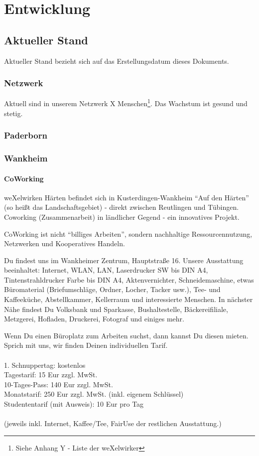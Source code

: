 
\chapter{Entwicklung}
  \section{Aktueller Stand}
Aktueller Stand bezieht sich auf das Erstellungsdatum dieses Dokuments.
    \subsection{Netzwerk}
Aktuell sind in unserem Netzwerk X Menschen\footnote{Siehe Anhang Y - Liste der weXelwirker}. Das Wachstum ist gesund und stetig.
    \subsection{Paderborn}
    \subsection{Wankheim}
      \subsubsection{CoWorking}
weXelwirken Härten befindet sich in Kusterdingen-Wankheim "`Auf den Härten"' (so heißt das Landschaftsgebiet) - direkt zwischen Reutlingen und Tübingen.
%
Coworking (Zusammenarbeit) in ländlicher Gegend - ein innovatives Projekt.



CoWorking ist nicht "`billiges Arbeiten"', sondern nachhaltige Ressourcennutzung, Netzwerken und Kooperatives Handeln.




Du findest uns im Wankheimer Zentrum, Hauptstraße 16.
Unsere Ausstattung beeinhaltet: Internet, WLAN, LAN, Laserdrucker SW bis DIN A4, Tintenstrahldrucker Farbe bis DIN A4, Aktenvernichter, Schneidemaschine, etwas Büromaterial (Briefumschläge, Ordner, Locher, Tacker usw.), Tee- und Kaffeeküche, Abstellkammer, Kellerraum und interessierte Menschen.
%
In nächster Nähe findest Du Volksbank und Sparkasse, Bushaltestelle, Bäckereifiliale, Metzgerei, Hofladen, Druckerei, Fotograf und einiges mehr.



Wenn Du einen Büroplatz zum Arbeiten suchst, dann kannst Du diesen mieten.
Sprich mit uns, wir finden Deinen individuellen Tarif.\\
\\
    1. Schnuppertag: kostenlos\\
    Tagestarif: 15 Eur zzgl. MwSt.\\ 
    10-Tages-Pass: 140 Eur zzgl. MwSt.\\
    Monatstarif: 250 Eur zzgl. MwSt. (inkl. eigenem Schlüssel)\\
    Studententarif (mit Ausweis): 10 Eur pro Tag\\
\\
(jeweils inkl. Internet, Kaffee/Tee, FairUse der restlichen Ausstattung.)\\

